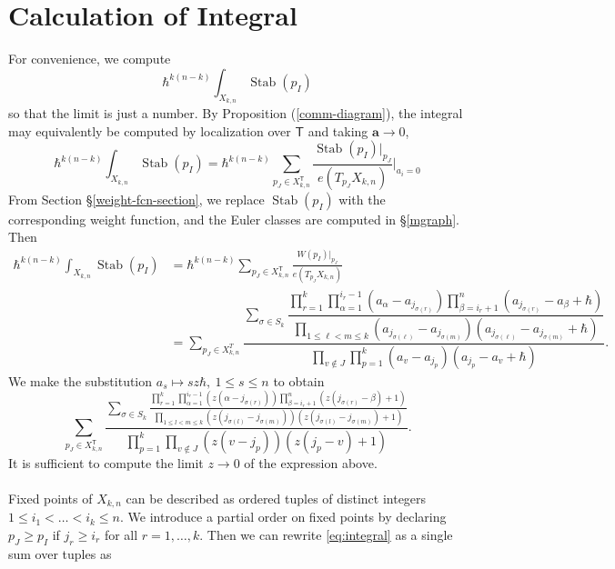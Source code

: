 \documentclass[12 pt]{article}
\theoremstyle{plain}
\theoremstyle{plain}
\theoremstyle{plain}
\theoremstyle{plain}
\theoremstyle{plain}
\theoremstyle{plain}
\theoremstyle{plain}
\theoremstyle{plain}
\theoremstyle{plain}
\theoremstyle{plain}
\theoremstyle{remark}
\theoremstyle{remark}
\theoremstyle{definition}
\theoremstyle{definition}
\theoremstyle{definition}
\theoremstyle{definition}
\theoremstyle{definition}
\theoremstyle{definition}
\DeclareMathOperator{\Stab}{Stab}
\newcommand{\bT}{\mathsf{T}}
\begin{document}
\section{Calculation of Integral}\label{int-calc}

For convenience, we compute
\[
\hbar^{k(n-k)}\int_{X_{k,n}}\Stab(p_{I})
\]
so that the limit is just a number. By Proposition (\ref{comm-diagram}), the integral may equivalently be computed by localization over $\bT$ and taking $\textbf{a}\to 0$,
\[
\hbar^{k(n-k)}\int_{X_{k,n}}\Stab(p_{I})=\hbar^{k(n-k)}\sum_{p_J\in X_{k,n}^\bT}\frac{\Stab(p_I)|_{p_J}}{e(T_{p_J}X_{k,n})}\Bigg|_{a_i=0} 
\]
From Section \S\ref{weight-fcn-section}, we replace $\Stab(p_I)$ with the corresponding weight function, and the Euler classes are computed in \S\ref{mgraph}. Then
\begin{align*}\hbar^{k(n-k)}\int_{X_{k,n}}\Stab(p_{I})&=\hbar^{k(n-k)}\sum\limits_{p_{J}\in X_{k,n}^{\bT}}\frac{W(p_{I})|_{p_{J}}}{e(T_{p_{J}}X_{k,n})}\\
&=\sum_{p_J\in X_{k,n}^T}\dfrac{\sum\limits_{\sigma \in S_k} \dfrac{\prod\limits_{r = 1}^k \prod\limits_{\alpha = 1}^{i_{r} - 1} (a_{\alpha} - a_{j_{\sigma(r)}}) \prod\limits_{\beta = i_r + 1}^n (a_{j_{\sigma(r)}} - a_{\beta} + \hbar) }{\prod\limits_{1 \leq \ell < m \leq k} (a_{j_{\sigma(\ell)}} - a_{j_{\sigma(m)}}) (a_{j_{\sigma(\ell)}} - a_{j_{\sigma(m)}} + \hbar)}}{\prod\limits_{v\not \in J} \prod\limits_{p = 1}^{k}(a_v - a_{j_p}) (a_{j_p}-a_v+\hbar)}.
\end{align*}
We make the substitution $a_{s}\mapsto sz\hbar,\ 1\leq s\leq n$ to obtain
\begin{equation}\label{eq:integral}
\sum\limits_{p_{J}\in X_{k,n}^{\bT}}\frac{\sum\limits_{\sigma\in S_{k}}\frac{\prod\limits_{r=1}^{k}\prod\limits_{\alpha=1}^{i_{r}-1}(z(\alpha-j_{\sigma(r)}))\prod\limits_{\beta=i_{r}+1}^{n}(z(j_{\sigma(r)}-\beta)+1)}{\prod\limits_{1\leq l<m\leq k}(z(j_{\sigma(l)}-j_{\sigma(m)}))(z(j_{\sigma(l)}-j_{\sigma(m)})+1)}}{\prod\limits_{p=1}^{k}\prod\limits_{v\notin J}(z(v-j_{p}))(z(j_{p}-v)+1)}.
\end{equation}
It is sufficient to compute the limit $z\to 0$ of the expression above.\\\\
Fixed points of $X_{k,n}$ can be described as ordered tuples of distinct integers $1\leq i_{1}<\dots<i_{k}\leq n$. We introduce a partial order on fixed points by declaring $p_J\geq p_I$ if $j_r\geq i_r$ for all $r=1,\dots,k$. Then we can rewrite \eqref{eq:integral} as a single sum over tuples as
\end{document}
